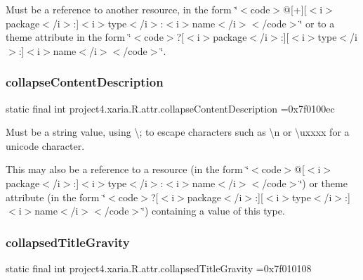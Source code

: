 Must be a reference to another resource, in the form \char`\"{}$<$code$>$@\mbox{[}+\mbox{]}\mbox{[}$<$i$>$package$<$/i$>$\+:\mbox{]}$<$i$>$type$<$/i$>$\+:$<$i$>$name$<$/i$>$$<$/code$>$\char`\"{} or to a theme attribute in the form \char`\"{}$<$code$>$?\mbox{[}$<$i$>$package$<$/i$>$\+:\mbox{]}\mbox{[}$<$i$>$type$<$/i$>$\+:\mbox{]}$<$i$>$name$<$/i$>$$<$/code$>$\char`\"{}. \mbox{\label{classproject4_1_1xaria_1_1R_1_1attr_a0801fe2783b9dec36e3b820ff3f2fba8}} 
\subsubsection{\texorpdfstring{collapse\+Content\+Description}{collapseContentDescription}}
{\footnotesize\ttfamily static final int project4.\+xaria.\+R.\+attr.\+collapse\+Content\+Description =0x7f0100ec\hspace{0.3cm}{\ttfamily [static]}}

Must be a string value, using \textquotesingle{}\textbackslash{};\textquotesingle{} to escape characters such as \textquotesingle{}\textbackslash{}n\textquotesingle{} or \textquotesingle{}\textbackslash{}uxxxx\textquotesingle{} for a unicode character. 

This may also be a reference to a resource (in the form \char`\"{}$<$code$>$@\mbox{[}$<$i$>$package$<$/i$>$\+:\mbox{]}$<$i$>$type$<$/i$>$\+:$<$i$>$name$<$/i$>$$<$/code$>$\char`\"{}) or theme attribute (in the form \char`\"{}$<$code$>$?\mbox{[}$<$i$>$package$<$/i$>$\+:\mbox{]}\mbox{[}$<$i$>$type$<$/i$>$\+:\mbox{]}$<$i$>$name$<$/i$>$$<$/code$>$\char`\"{}) containing a value of this type. \mbox{\label{classproject4_1_1xaria_1_1R_1_1attr_a5db6931b35ad4127cb69af77ce5d6a19}} 
\subsubsection{\texorpdfstring{collapsed\+Title\+Gravity}{collapsedTitleGravity}}
{\footnotesize\ttfamily static final int project4.\+xaria.\+R.\+attr.\+collapsed\+Title\+Gravity =0x7f010108\hspace{0.3cm}{\ttfamily [static]}}

